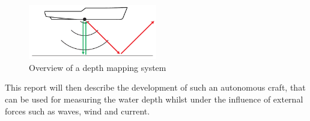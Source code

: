 \documentclass[a4paper,11pt,oneside,fleqn]{article}
\begin{document}
\begin{figure}[h]
\centering
\includegraphics[width=0.5\textwidth]{img/beamer}
\caption{Overview of a depth mapping system}
\label{fig:beamer}
\end{figure}

This report will then describe the development of such an autonomous craft, that can be used for measuring the water depth whilst under the influence of external forces such as waves, wind and current. 
\end{document}
